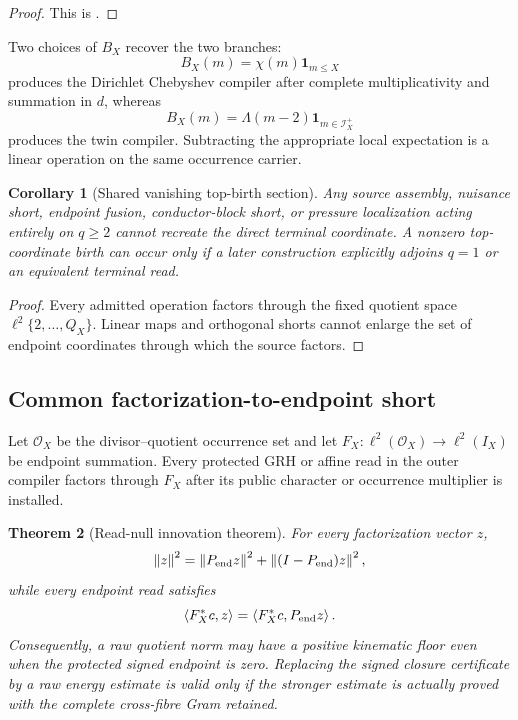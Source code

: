 \documentclass[11pt]{article}
\newtheorem{theorem}{Theorem}[section]
\newtheorem{corollary}[theorem]{Corollary}
\theoremstyle{definition}
\theoremstyle{remark}
\newcommand{\one}{\mathbf 1}
\newcommand{\norm}[1]{\left\lVert#1\right\rVert}
\newcommand{\ip}[2]{\left\langle#1,#2\right\rangle}
\begin{document}
\begin{proof}
This is .
\end{proof}

Two choices of $B_X$ recover the two branches:
\[
 B_X(m)=\chi(m)\one_{m\le X}
\]
produces the Dirichlet Chebyshev compiler after complete multiplicativity and
summation in $d$, whereas
\[
 B_X(m)=\Lambda(m-2)\one_{m\in\mathscr I_X^+}
\]
produces the twin compiler.  Subtracting the appropriate local expectation is
a linear operation on the same occurrence carrier.

\begin{corollary}[Shared vanishing top-birth section]
Any source assembly, nuisance short, endpoint fusion, conductor-block short,
or pressure localization acting entirely on $q\ge2$ cannot recreate the
direct terminal coordinate.  A nonzero top-coordinate birth can occur only if
a later construction explicitly adjoins $q=1$ or an equivalent terminal read.
\end{corollary}

\begin{proof}
Every admitted operation factors through the fixed quotient space
$\ell^2\{2,\ldots,Q_X\}$.  Linear maps and orthogonal shorts cannot enlarge
the set of endpoint coordinates through which the source factors.
\end{proof}

\subsection{Common factorization-to-endpoint short}

Let $\mathcal O_X$ be the divisor--quotient occurrence set and let
$F_X:\ell^2(\mathcal O_X)\to\ell^2(I_X)$ be endpoint summation.  Every
protected GRH or affine read in the outer compiler factors through $F_X$ after
its public character or occurrence multiplier is installed.

\begin{theorem}[Read-null innovation theorem]
\label{thm:common-read-null}
For every factorization vector $z$,
\[
 \norm z^2
 =\norm{P_{\rm end}z}^2+\norm{(I-P_{\rm end})z}^2,
\]
while every endpoint read satisfies
\[
 \ip{F_X^*c}{z}=\ip{F_X^*c}{P_{\rm end}z}.
\]
Consequently, a raw quotient norm may have a positive kinematic floor even
when the protected signed endpoint is zero.  Replacing the signed closure
certificate by a raw energy estimate is valid only if the stronger estimate
is actually proved with the complete cross-fibre Gram retained.
\end{theorem}
\end{document}
